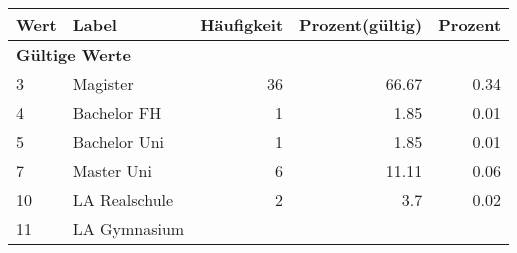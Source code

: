      \begin{longtable}{lXrrr}
     \toprule
     \textbf{Wert} & \textbf{Label} & \textbf{Häufigkeit} & \textbf{Prozent(gültig)} & \textbf{Prozent} \\
     \endhead
     \midrule
     \multicolumn{5}{l}{\textbf{Gültige Werte}}\\

     3 &
     \multicolumn{1}{X}{ Magister   } &


       \num{36} &
       \num[round-mode=places,round-precision=2]{66.67} &
         \num[round-mode=places,round-precision=2]{0.34} \\

     4 &
     \multicolumn{1}{X}{ Bachelor FH   } &


       \num{1} &
       \num[round-mode=places,round-precision=2]{1.85} &
         \num[round-mode=places,round-precision=2]{0.01} \\

     5 &
     \multicolumn{1}{X}{ Bachelor Uni   } &


       \num{1} &
       \num[round-mode=places,round-precision=2]{1.85} &
         \num[round-mode=places,round-precision=2]{0.01} \\

     7 &
     \multicolumn{1}{X}{ Master Uni   } &


       \num{6} &
       \num[round-mode=places,round-precision=2]{11.11} &
         \num[round-mode=places,round-precision=2]{0.06} \\

     10 &
     \multicolumn{1}{X}{ LA Realschule   } &


       \num{2} &
       \num[round-mode=places,round-precision=2]{3.7} &
         \num[round-mode=places,round-precision=2]{0.02} \\

     11 &
     \multicolumn{1}{X}{ LA Gymnasium   } &



\end{longtable}
